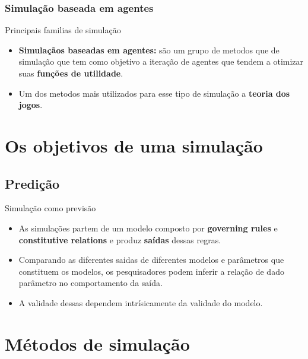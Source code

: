 \documentclass{beamer}
\begin{document}
	\subsubsection{Simulação baseada em agentes}
	\begin{frame}{Principais familias de simulação}
		\begin{itemize}[<+->]
			\item \textbf{Simulaçãos baseadas em agentes:} são um grupo de metodos que de simulação que tem como objetivo a iteração de agentes que tendem a otimizar suas \textbf{funções de utilidade}.
			\item Um dos metodos mais utilizados para esse tipo de simulação a \textbf{teoria dos jogos}.
		\end{itemize}
	\end{frame}
	\section{Os objetivos de uma simulação}
	\subsection{Predição}
	\begin{frame}{Simulação como previsão}
		\begin{itemize}
			\item As simulações partem de um modelo composto por \textbf{governing rules} e \textbf{constitutive relations} e produz \textbf{saídas} dessas regras.
			\item Comparando as diferentes saidas de diferentes modelos e parâmetros que constituem os modelos, os pesquisadores podem inferir a relação de dado parâmetro no comportamento da saída.
			\item A validade dessas dependem intrísicamente da validade do modelo.
			
		\end{itemize}
	\end{frame}
	\section{Métodos de simulação}
\end{document}
